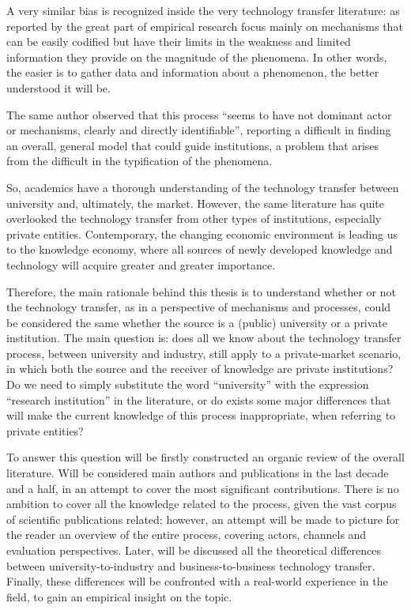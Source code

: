 A very similar bias is recognized inside the very technology transfer literature: as reported by \citet{Muscio2008} the great part of empirical research focus mainly on mechanisms that can be easily codified but have their limits in the weakness and limited information they provide on the magnitude of the phenomena. In other words, the easier is to gather data and information about a phenomenon, the better understood it will be. 

The same author observed that this process \enquote{seems to have not dominant actor or mechanisms, clearly and directly identifiable}, reporting a difficult in finding an overall, general model that could guide institutions, a problem that arises from the difficult in the typification of the phenomena.

So, academics have a thorough understanding of the technology transfer between university and, ultimately, the market. However, the same literature has quite overlooked the technology transfer from other types of institutions, especially private entities. Contemporary, the changing economic environment is leading us to the knowledge economy, where all sources of newly developed knowledge and technology will acquire greater and greater importance. 

Therefore, the main rationale behind this thesis is to understand whether or not the technology transfer, as in a perspective of mechanisms and processes, could be considered the same whether the source is a (public) university or a private institution. The main question is: does all we know about the technology transfer process, between university and industry, still apply to a private-market scenario, in which both the source and the receiver of knowledge are private institutions? Do we need to simply substitute the word \enquote{university} with the expression \enquote{research institution} in the literature, or do exists some major differences that will make the current knowledge of this process inappropriate, when referring to private entities?

To answer this question will be firstly constructed an organic review of the overall literature. Will be considered main authors and publications in the last decade and a half, in an attempt to cover the most significant contributions. There is no ambition to cover all the knowledge related to the process, given the vast corpus of scientific publications related; however, an attempt will be made to picture for the reader an overview of the entire process, covering actors, channels and evaluation perspectives. Later, will be discussed all the theoretical differences between university-to-industry and business-to-business technology transfer. Finally, these differences will be confronted with a real-world experience in the field, to gain an empirical insight on the topic.


